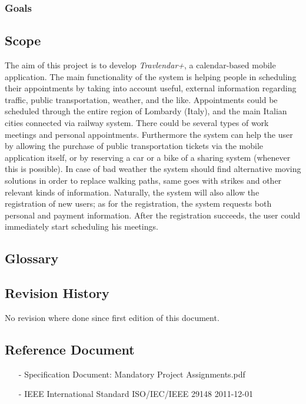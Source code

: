 \documentclass[12pt, a4paper]{article}
\begin{document}
		\subsubsection{Goals}
			
		
		\subsection{Scope}
		The aim of this project is to develop \textit{Travlendar+}, a calendar-based mobile application. 
		The main functionality of the system is helping people in scheduling their appointments by taking into account useful, external information regarding traffic, public transportation, weather, and the like. 
		Appointments could be scheduled through the entire region of Lombardy (Italy), and the main Italian cities connected via railway system. There could be several types of work meetings and personal appointments.
		Furthermore the system can help the user by allowing the purchase of public transportation tickets via the mobile application itself, or by reserving a car or a bike of a sharing system (whenever this is possible). In case of bad weather the system should find alternative moving solutions in order to replace walking paths, same goes with strikes and other relevant kinds of information. 
		Naturally, the system will also allow the registration of new users; as for the registration, the system requests both personal and payment information. After the registration succeeds, the user could immediately start scheduling his meetings.
		
		\subsection{Glossary}
			
		
		\subsection{Revision History}
			No revision where done since first edition of this document.
			
		\subsection{Reference Document}
			\begin{itemize}
				\item[-] \textsf{Specification Document: Mandatory Project Assignments.pdf}
				\item[-] \textsf{IEEE International Standard ISO/IEC/IEEE 29148 2011-12-01}
			\end{itemize}
		
\end{document}
